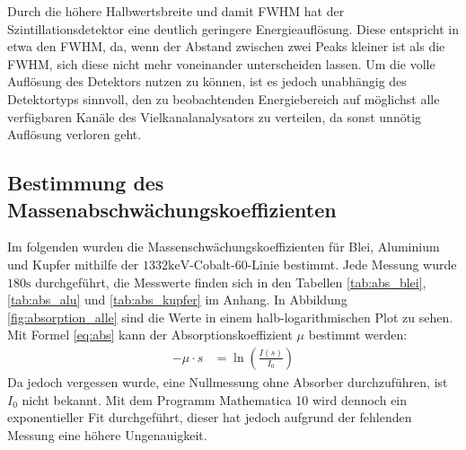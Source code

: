 \documentclass[
	parskip=half,10pt,
	numbers= noenddot, %
	toc=flat, %
	oneside,
	twocolumn,
	]{scrartcl}
\begin{document}
Durch die höhere Halbwertsbreite und damit FWHM hat der Szintillationsdetektor eine deutlich geringere Energieauflösung. Diese entspricht in etwa den 
FWHM, da, wenn der Abstand zwischen zwei Peaks kleiner ist als die FWHM, sich diese nicht mehr voneinander unterscheiden lassen. Um die 
volle Auflösung des Detektors nutzen zu können, ist es jedoch unabhängig des Detektortyps sinnvoll, den zu beobachtenden Energiebereich auf möglichst 
alle verfügbaren Kanäle des Vielkanalanalysators zu verteilen, da sonst unnötig Auflösung verloren geht. 


\subsection{Bestimmung des Massenabschwächungskoeffizienten}

Im folgenden wurden die Massenschwächungskoeffizienten für Blei, Aluminium und Kupfer mithilfe der $1332 \si{\kilo \electronvolt}$-Cobalt-60-Linie bestimmt. Jede Messung 
wurde $180 \si{\second}$ durchgeführt, die Messwerte finden sich in den Tabellen \ref{tab:abs_blei}, \ref{tab:abs_alu} und \ref{tab:abs_kupfer} im Anhang. 
In Abbildung \ref{fig:absorption_alle} sind die Werte in einem halb-logarithmischen Plot zu sehen. Mit Formel \ref{eq:abs} kann der Absorptionskoeffizient $\mu$ 
bestimmt werden: 
\begin{align}
- \mu \cdot s &= \ln{\left( \frac{I(s)}{I_0} \right )} 
\end{align}
Da jedoch vergessen wurde, eine Nullmessung ohne Absorber durchzuführen, ist $I_0$ nicht bekannt. Mit dem Programm Mathematica 10 wird dennoch ein exponentieller 
Fit durchgeführt, dieser hat jedoch aufgrund der fehlenden Messung eine höhere Ungenauigkeit. 
\end{document}
